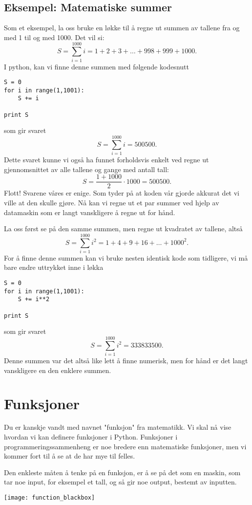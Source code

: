 \documentclass[a4paper, 11pt, notitlepage]{article}
\begin{document}
\subsection{Eksempel: Matematiske summer}
Som et eksempel, la oss bruke en løkke til å regne ut summen av tallene fra og med 1 til og med 1000. Det vil si:
$$S = \sum_{i=1}^{1000} i = 1 + 2 + 3 + \ldots + 998 + 999 + 1000.$$
I python, kan vi finne denne summen med følgende kodesnutt
\begin{lstlisting}
S = 0
for i in range(1,1001):
    S += i

print S
\end{lstlisting}
\vspace{-0.3cm}
som gir svaret
$$S = \sum_{i=1}^{1000} i = 500500.$$
Dette svaret kunne vi også ha funnet forholdsvis enkelt ved regne ut gjennomsnittet av alle tallene og gange med antall tall:
$$S = \frac{1+1000}{2}\cdot 1000 = 500500.$$
Flott! Svarene våres er enige. Som tyder på at koden vår gjorde akkurat det vi ville at den skulle gjøre. Nå kan vi regne ut et par summer ved hjelp av datamaskin som er langt vanskligere å regne ut for hånd.

La oss først se på den samme summen, men regne ut kvadratet av tallene, altså
$$S = \sum_{i=1}^{1000} i^2 = 1 + 4 + 9 + 16 + \ldots + 1000^2.$$
For å finne denne summen kan vi bruke nesten identisk kode som tidligere, vi må bare endre uttrykket inne i løkka
\begin{lstlisting}
S = 0
for i in range(1,1001):
    S += i**2

print S
\end{lstlisting}
\vspace{-0.3cm}
som gir svaret
$$S = \sum_{i=1}^{1000} i^2 = 333833500.$$
Denne summen var det altså like lett å finne numerisk, men for hånd er det langt vanskligere en den enklere summen.

\clearpage


\section{Funksjoner}
Du er kanskje vandt med navnet "funksjon" fra matematikk. Vi skal nå vise hvordan vi kan definere funksjoner i Python. Funksjoner i programmeringssammenheng er noe bredere enn matematiske funksjoner, men vi kommer fort til å se at de har mye til felles.

Den enkleste måten å tenke på en funksjon, er å se på det som en maskin, som tar noe input, for eksempel et tall, og så gir noe output, bestemt av inputten.
\begin{center}
\texttt{[image: function\_blackbox]}    
\end{center}
\end{document}
